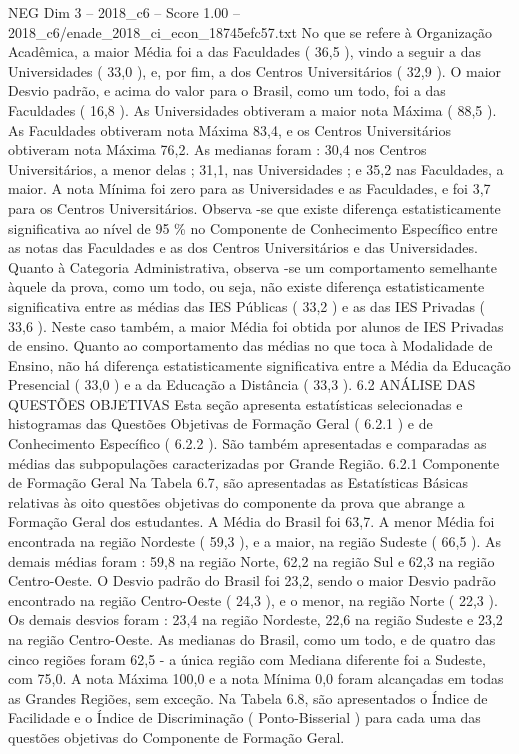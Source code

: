 \begin{textsample}{NEG Dim 3 – 2018\_c6 – Score 1.00 – 2018\_c6/enade\_2018\_ci\_econ\_18745efc57.txt}
No que se refere à Organização Acadêmica, a maior Média foi a das Faculdades ( 36,5 ), vindo a seguir a das Universidades ( 33,0 ), e, por fim, a dos Centros Universitários ( 32,9 ).
O maior Desvio padrão, e acima do valor para o Brasil, como um todo, foi a das Faculdades ( 16,8 ).
As Universidades obtiveram a maior nota Máxima ( 88,5 ).
As Faculdades obtiveram nota Máxima 83,4, e os Centros Universitários obtiveram nota Máxima 76,2.
As medianas foram : 30,4 nos Centros Universitários, a menor delas ; 31,1, nas Universidades ; e 35,2 nas Faculdades, a maior.
A nota Mínima foi zero para as Universidades e as Faculdades, e foi 3,7 para os Centros Universitários.
Observa -se que existe diferença estatisticamente significativa ao nível de 95 \% no Componente de Conhecimento Específico entre as notas das Faculdades e as dos Centros Universitários e das Universidades.
Quanto à Categoria Administrativa, observa -se um comportamento semelhante àquele da prova, como um todo, ou seja, não existe diferença estatisticamente significativa entre as médias das IES Públicas ( 33,2 ) e as das IES Privadas ( 33,6 ).
Neste caso também, a maior Média foi obtida por alunos de IES Privadas de ensino.
Quanto ao comportamento das médias no que toca à Modalidade de Ensino, não há diferença estatisticamente significativa entre a Média da Educação Presencial ( 33,0 ) e a da Educação a Distância ( 33,3 ). 6.2 ANÁLISE DAS QUESTÕES OBJETIVAS Esta seção apresenta estatísticas selecionadas e histogramas das Questões Objetivas de Formação Geral ( 6.2.1 ) e de Conhecimento Específico ( 6.2.2 ).
São também apresentadas e comparadas as médias das subpopulações caracterizadas por Grande Região. 6.2.1 Componente de Formação Geral Na Tabela 6.7, são apresentadas as Estatísticas Básicas relativas às oito questões objetivas do componente da prova que abrange a Formação Geral dos estudantes.
A Média do Brasil foi 63,7.
A menor Média foi encontrada na região Nordeste ( 59,3 ), e a maior, na região Sudeste ( 66,5 ).
As demais médias foram : 59,8 na região Norte, 62,2 na região Sul e 62,3 na região Centro-Oeste.
O Desvio padrão do Brasil foi 23,2, sendo o maior Desvio padrão encontrado na região Centro-Oeste ( 24,3 ), e o menor, na região Norte ( 22,3 ).
Os demais desvios foram : 23,4 na região Nordeste, 22,6 na região Sudeste e 23,2 na região Centro-Oeste.
As medianas do Brasil, como um todo, e de quatro das cinco regiões foram 62,5 - a única região com Mediana diferente foi a Sudeste, com 75,0.
A nota Máxima 100,0 e a nota Mínima 0,0 foram alcançadas em todas as Grandes Regiões, sem exceção.
Na Tabela 6.8, são apresentados o Índice de Facilidade e o Índice de Discriminação ( Ponto-Bisserial ) para cada uma das questões objetivas do Componente de Formação Geral.

\end{textsample}
